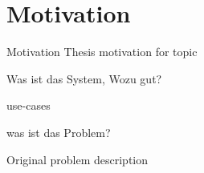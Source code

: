 \section{Motivation}
\begin{frame}{Motivation}
	Thesis motivation for topic
	
	
	Was ist das System, Wozu gut?
	
	use-cases
	
	was ist das Problem?
	
	Original problem description
\end{frame}